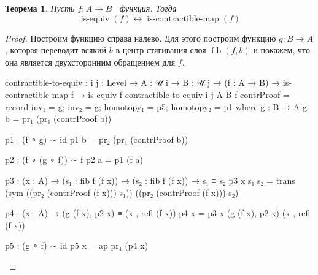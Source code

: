 \documentclass{article}[12pt]
\newtheorem{theorem}{Теорема}
\newcommand{\dash}{\textemdash\ }
\newcommand{\op}{\operatorname}
\begin{document}
\begin{theorem}
    \label{EquivalenceIffContractibleTheorem}
    Пусть $f : A \rightarrow B$ \dash функция. Тогда
    $$\op{is-equiv}(f) \leftrightarrow \op{is-contractible-map}(f)$$
\end{theorem}
\begin{proof}
Построим функцию справа налево. Для этого построим функцию $g : B \rightarrow A$,
которая переводит всякий $b$ в центр стягивания слоя $\op{fib}(f, b)$ и покажем, 
что она является двухсторонним обращением для $f$.
\begin{code}
contractible-to-equiv : {i j : Level} → {A : 𝒰 i} → {B : 𝒰 j}
                        → (f : A → B)
                        → is-contractible-map f
                        → is-equiv f
contractible-to-equiv {i} {j} {A} {B} f contrProof = 
    record {
        inv₁ = g;
        inv₂ = g;
        homotopy₁ = p5;
        homotopy₂ = p1
    }
    where
        g : B → A
        g b = pr₁ (pr₁ (contrProof b))

        p1 : (f ∘ g) ∼ id
        p1 b = pr₂ (pr₁ (contrProof b))

        p2 : (f ∘ (g ∘ f)) ∼ f
        p2 a = p1 (f a)

        p3 : (x : A) → (s₁ : fib f (f x)) → (s₂ : fib f (f x))
             → s₁ ≡ s₂
        p3 x s₁ s₂ = trans (sym ((pr₂ (contrProof (f x))) s₁)) ((pr₂ (contrProof (f x))) s₂)

        p4 : (x : A) → (g (f x), p2 x) ≡ (x , refl (f x))
        p4 x = p3 x (g (f x), p2 x) (x , refl (f x))

        p5 : (g ∘ f) ∼ id
        p5 x = ap pr₁ (p4 x)
\end{code}


\end{proof}
\end{document}
